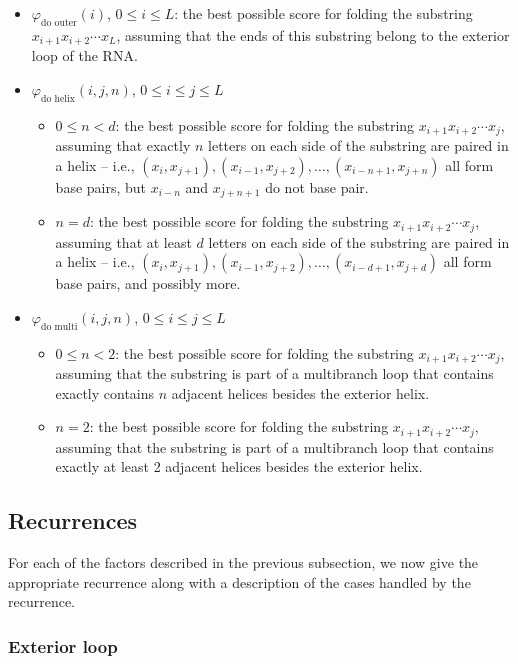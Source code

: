 \documentclass{article}
\newcommand{\doouter}{\varphi_\text{do outer}}
\newcommand{\domulti}{\varphi_\text{do multi}}
\newcommand{\dohelix}{\varphi_\text{do helix}}
\begin{document}
  \begin{itemize}
  \item $\doouter(i)$, $0 \le i \le L$: the best possible score for folding the 
    substring $x_{i+1} x_{i+2} \cdots x_L$, assuming that the ends of this substring
    belong to the exterior loop of the RNA.
  \item $\dohelix(i,j,n)$, $0 \le i \le j \le L$
    \begin{itemize}
    \item $0 \le n < d$: the best possible score for folding the substring 
      $x_{i+1} x_{i+2} \cdots x_j$, assuming that exactly $n$ letters on each side of the substring 
      are paired in a helix -- i.e., $(x_i,x_{j+1}), (x_{i-1},x_{j+2}), \ldots, (x_{i-n+1},x_{j+n})$ all form
      base pairs, but $x_{i-n}$ and $x_{j+n+1}$ do not base pair.
    \item $n=d$: the best possible score for folding the substring 
      $x_{i+1} x_{i+2} \cdots x_j$, assuming that at least $d$ letters on each side of the substring
      are paired in a helix -- i.e., $(x_i,x_{j+1}), (x_{i-1},x_{j+2}), \ldots, (x_{i-d+1},x_{j+d})$ all form
      base pairs, and possibly more.      
    \end{itemize}
  \item $\domulti(i,j,n)$, $0 \le i \le j \le L$
    \begin{itemize}
    \item $0 \le n < 2$: the best possible score for folding the substring 
      $x_{i+1} x_{i+2} \cdots x_j$, assuming that the substring is part of a multibranch loop
      that contains exactly contains $n$ adjacent helices besides the exterior helix.
    \item $n = 2$: the best possible score for folding the substring 
      $x_{i+1} x_{i+2} \cdots x_j$, assuming that the substring is part of a multibranch loop
      that contains exactly at least 2 adjacent helices besides the exterior helix.
    \end{itemize}
  \end{itemize}

  \subsection{Recurrences}

  For each of the factors described in the previous subsection, we now give the appropriate
  recurrence along with a description of the cases handled by the recurrence.

  \subsubsection{Exterior loop}
\end{document}
